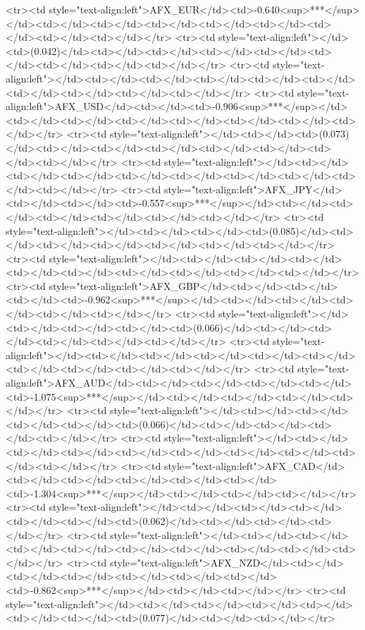 <tr><td style="text-align:left">AFX_EUR</td><td>-0.640<sup>***</sup></td><td></td><td></td><td></td><td></td><td></td><td></td><td></td><td></td></tr>
<tr><td style="text-align:left"></td><td>(0.042)</td><td></td><td></td><td></td><td></td><td></td><td></td><td></td><td></td></tr>
<tr><td style="text-align:left"></td><td></td><td></td><td></td><td></td><td></td><td></td><td></td><td></td><td></td></tr>
<tr><td style="text-align:left">AFX_USD</td><td></td><td>-0.906<sup>***</sup></td><td></td><td></td><td></td><td></td><td></td><td></td><td></td></tr>
<tr><td style="text-align:left"></td><td></td><td>(0.073)</td><td></td><td></td><td></td><td></td><td></td><td></td><td></td></tr>
<tr><td style="text-align:left"></td><td></td><td></td><td></td><td></td><td></td><td></td><td></td><td></td><td></td></tr>
<tr><td style="text-align:left">AFX_JPY</td><td></td><td></td><td>-0.557<sup>***</sup></td><td></td><td></td><td></td><td></td><td></td><td></td></tr>
<tr><td style="text-align:left"></td><td></td><td></td><td>(0.085)</td><td></td><td></td><td></td><td></td><td></td><td></td></tr>
<tr><td style="text-align:left"></td><td></td><td></td><td></td><td></td><td></td><td></td><td></td><td></td><td></td></tr>
<tr><td style="text-align:left">AFX_GBP</td><td></td><td></td><td></td><td>-0.962<sup>***</sup></td><td></td><td></td><td></td><td></td><td></td></tr>
<tr><td style="text-align:left"></td><td></td><td></td><td></td><td>(0.066)</td><td></td><td></td><td></td><td></td><td></td></tr>
<tr><td style="text-align:left"></td><td></td><td></td><td></td><td></td><td></td><td></td><td></td><td></td><td></td></tr>
<tr><td style="text-align:left">AFX_AUD</td><td></td><td></td><td></td><td></td><td>-1.075<sup>***</sup></td><td></td><td></td><td></td><td></td></tr>
<tr><td style="text-align:left"></td><td></td><td></td><td></td><td></td><td>(0.066)</td><td></td><td></td><td></td><td></td></tr>
<tr><td style="text-align:left"></td><td></td><td></td><td></td><td></td><td></td><td></td><td></td><td></td><td></td></tr>
<tr><td style="text-align:left">AFX_CAD</td><td></td><td></td><td></td><td></td><td></td><td>-1.304<sup>***</sup></td><td></td><td></td><td></td></tr>
<tr><td style="text-align:left"></td><td></td><td></td><td></td><td></td><td></td><td>(0.062)</td><td></td><td></td><td></td></tr>
<tr><td style="text-align:left"></td><td></td><td></td><td></td><td></td><td></td><td></td><td></td><td></td><td></td></tr>
<tr><td style="text-align:left">AFX_NZD</td><td></td><td></td><td></td><td></td><td></td><td></td><td>-0.862<sup>***</sup></td><td></td><td></td></tr>
<tr><td style="text-align:left"></td><td></td><td></td><td></td><td></td><td></td><td></td><td>(0.077)</td><td></td><td></td></tr>
